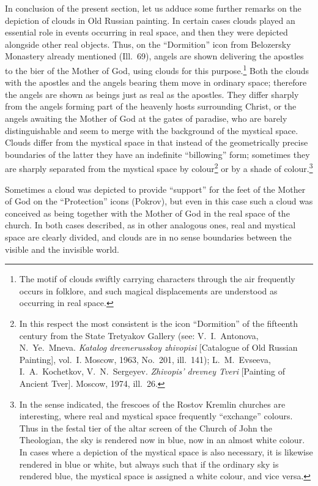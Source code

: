 In conclusion of the present section, let us adduce some further remarks on the depiction
of clouds in Old Russian painting.  In certain cases clouds played an essential role in
events occurring in real space, and then they were depicted alongside other real objects.
Thus, on the ``Dormition'' icon from Belozersky Monastery already mentioned (Ill.~69),
angels are shown delivering the apostles to the bier of the Mother of God, using clouds
for this purpose.\footnote{The motif of clouds swiftly carrying characters through the
  air frequently occurs in folklore, and such magical displacements are understood as
  occurring in real space.}  Both the clouds with the apostles and the angels bearing
them move in ordinary space; therefore the angels are shown as beings just as real as the
apostles.  They differ sharply from the angels forming part of the heavenly hosts
surrounding Christ, or the angels awaiting the Mother of God at the gates of paradise,
who are barely distinguishable and seem to merge with the background of the mystical
space.  Clouds differ from the mystical space in that instead of the geometrically precise
boundaries of the latter they have an indefinite ``billowing'' form; sometimes they are
sharply separated from the mystical space by colour\footnote{In this respect the most
  consistent is the icon ``Dormition'' of the fifteenth century from the State Tretyakov
  Gallery (see: V.~I.~Antonova, N.~Ye.~Mneva.  \emph{Katalog drevnerusskoy zhivopisi}
  [Catalogue of Old Russian Painting], vol.~I.  Moscow, 1963, No.~201, ill.~141);
  L.~M.~Evseeva, I.~A.~Kochetkov, V.~N.~Sergeyev.  \emph{Zhivopis' drevney Tveri}
  [Painting of Ancient Tver].  Moscow, 1974, ill.~26.} or by a shade of
colour.\footnote{In the sense indicated, the frescoes of the Rostov Kremlin churches are
  interesting, where real and mystical space frequently ``exchange'' colours.  Thus in
  the festal tier of the altar screen of the Church of John the Theologian, the sky is
  rendered now in blue, now in an almost white colour.  In cases where a depiction of the
  mystical space is also necessary, it is likewise rendered in blue or white, but always
  such that if the ordinary sky is rendered blue, the mystical space is assigned a white
  colour, and vice versa.}

Sometimes a cloud was depicted to provide ``support'' for the feet of the Mother of God
on the ``Protection'' icons (Pokrov), but even in this case such a cloud was conceived
as being together with the Mother of God in the real space of the church.  In both cases
described, as in other analogous ones, real and mystical space are clearly divided, and
clouds are in no sense boundaries between the visible and the invisible world.

